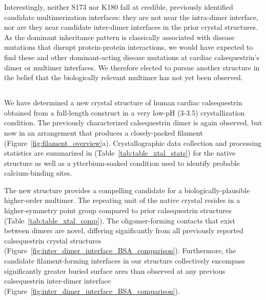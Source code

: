 Interestingly, neither S173 nor K180 fall at credible, previously identified candidate multimerization interfaces: they are not near the intra-dimer interface, nor are they near candidate inter-dimer interfaces in the prior crystal structures. As the dominant inheritance pattern is classically associated with disease mutations that disrupt protein-protein interactions, we would have expected to find these and other dominant-acting disease mutations at cardiac calsequestrin's dimer or multimer interfaces. We therefore elected to pursue another structure in the belief that the biologically relevant multimer has not yet been observed. %

\subsection{\headingsubsectiontwo}

We have determined a new crystal structure of human cardiac calsequestrin obtained from a full-length construct in a very low-pH (3-3.5) crystallization condition. The previously characterized calsequestrin dimer is again observed, but now in an arrangement that produces a closely-packed filament (Figure~\ref{fig:filament_overview}a). Crystallographic data collection and processing statistics are summarized in (Table~\ref{tab:table_xtal_stats}) for the native structure as well as a ytterbium-soaked condition used to identify probable calcium-binding sites. %

The new structure provides a compelling candidate for a biologically-plausible higher-order multimer. The repeating unit of the native crystal resides in a higher-symmetry point group compared to prior calsequestrin structures (Table~\ref{tab:table_xtal_comp}). The oligomer-forming contacts that exist between dimers are novel, differing significantly from all previously reported calsequestrin crystal structures (Figure~\ref{fig:inter_dimer_interface_BSA_comparison}). Furthermore, the candidate filament-forming interfaces in our structure collectively encompass significantly greater buried surface area than observed at any previous calsequestrin inter-dimer interface (Figure~\ref{fig:inter_dimer_interface_BSA_comparison}). 
 
